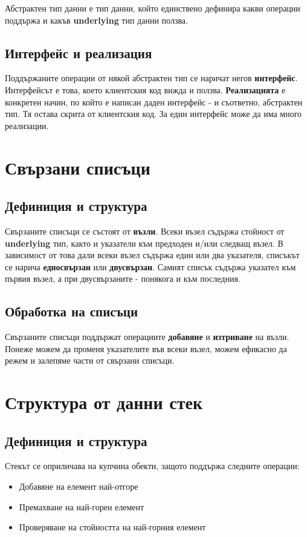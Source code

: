 \documentclass[fleqn,12pt]{article}
\begin{document}
Абстрактен тип данни е тип данни, който единствено дефинира какви операции поддържа и какъв \textbf{underlying} тип данни ползва.

\subsection{Интерфейс и реализация}
Поддържаните операции от някой абстрактен тип се наричат негов \textbf{интерфейс}. Интерфейсът е това, което клиентския код 
вижда и ползва. \textbf{Реализацията} е конкретен начин, по който е написан даден интерфейс - и съответно, абстрактен тип.
Тя остава скрита от клиентския код. За един интерфейс може да има много реализации.

\section{Свързани списъци}
\subsection{Дефиниция и структура}
Свързаните списъци се състоят от \textbf{възли}. Всеки възел съдържа стойност от \textbf{underlying} тип, както 
и указатели към предходен и/или следващ възел. В зависимост от това дали всеки възел съдържа един или два указателя,
списъкът се нарича \textbf{едносвързан} или \textbf{двусвързан}. Самият списък съдържа указател към първия възел, 
а при двусвързаните - понякога и към последния.

\subsection{Обработка на списъци}
Свързаните списъци поддържат операциите \textbf{добавяне} и \textbf{изтриване} на възли.
Понеже можем да променя указателите във всеки възел, можем ефикасно да режем и залепяме части от свързани списъци. 

\section{Структура от данни стек}
\subsection{Дефиниция и структура}
Стекът се оприличава на купчина обекти, защото поддържа следните операции:
\begin{itemize}
    \item Добавяне на елемент най-отгоре
    \item Премахване на най-горен елемент
    \item Проверяване на стойността на най-горния елемент
\end{itemize}
\end{document}

